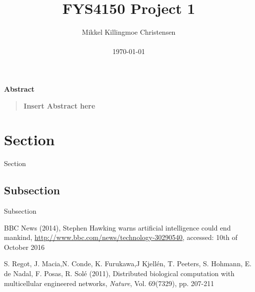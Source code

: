 \documentclass[12pt]{article}
\title{FYS4150 Project 1}
\author
{Mikkel Killingmoe Christensen\\
\\
\normalsize{\today}
}
\date{}
\newenvironment{sciabstract}{%
\begin{quote} \bf}
{\end{quote}}
\begin{document}
 


\baselineskip24pt


\maketitle 




\begin{center}
{\large \textbf{Abstract}}
\end{center}
\begin{sciabstract}
Insert  Abstract here
\end{sciabstract}

\section{Section}
Section

\subsection{Subsection}
Subsection

\begin{flushleft}

\begin{thebibliography}{}

\singlespacing
\small


  BBC News (2014),
  Stephen Hawking warns artificial intelligence could end mankind,
  \url{http://www.bbc.com/news/technology-30290540},
  accessed: 10th of October 2016

  
  S. Regot, J. Macia,N. Conde, K. Furukawa,J Kjellén, T. Peeters, S. Hohmann, E. de Nadal, F. Posas, R. Solé (2011),
  Distributed biological computation with multicellular engineered networks,
  \emph{Nature}, Vol. 69(7329), pp. 207-211
  
\end{thebibliography}
\end{flushleft}
\end{document}
